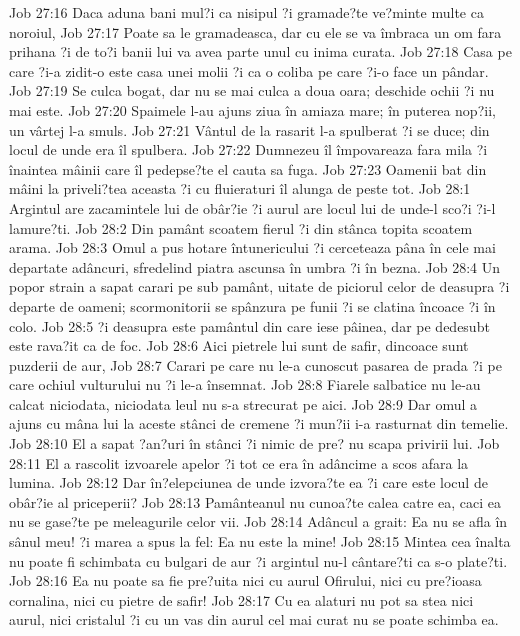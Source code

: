 Job 27:16  Daca aduna bani mul?i ca nisipul ?i gramade?te ve?minte multe ca noroiul,
Job 27:17  Poate sa le gramadeasca, dar cu ele se va îmbraca un om fara prihana ?i de to?i banii lui va avea parte unul cu inima curata.
Job 27:18  Casa pe care ?i-a zidit-o este casa unei molii ?i ca o coliba pe care ?i-o face un pândar.
Job 27:19  Se culca bogat, dar nu se mai culca a doua oara; deschide ochii ?i nu mai este.
Job 27:20  Spaimele l-au ajuns ziua în amiaza mare; în puterea nop?ii, un vârtej l-a smuls.
Job 27:21  Vântul de la rasarit l-a spulberat ?i se duce; din locul de unde era îl spulbera.
Job 27:22  Dumnezeu îl împovareaza fara mila ?i înaintea mâinii care îl pedepse?te el cauta sa fuga.
Job 27:23  Oamenii bat din mâini la priveli?tea aceasta ?i cu fluieraturi îl alunga de peste tot.
Job 28:1  Argintul are zacamintele lui de obâr?ie ?i aurul are locul lui de unde-l sco?i ?i-l lamure?ti.
Job 28:2  Din pamânt scoatem fierul ?i din stânca topita scoatem arama.
Job 28:3  Omul a pus hotare întunericului ?i cerceteaza pâna în cele mai departate adâncuri, sfredelind piatra ascunsa în umbra ?i în bezna.
Job 28:4  Un popor strain a sapat carari pe sub pamânt, uitate de piciorul celor de deasupra ?i departe de oameni; scormonitorii se spânzura pe funii ?i se clatina încoace ?i în colo.
Job 28:5  ?i deasupra este pamântul din care iese pâinea, dar pe dedesubt este rava?it ca de foc.
Job 28:6  Aici pietrele lui sunt de safir, dincoace sunt puzderii de aur,
Job 28:7  Carari pe care nu le-a cunoscut pasarea de prada ?i pe care ochiul vulturului nu ?i le-a însemnat.
Job 28:8  Fiarele salbatice nu le-au calcat niciodata, niciodata leul nu s-a strecurat pe aici.
Job 28:9  Dar omul a ajuns cu mâna lui la aceste stânci de cremene ?i mun?ii i-a rasturnat din temelie.
Job 28:10  El a sapat ?an?uri în stânci ?i nimic de pre? nu scapa privirii lui.
Job 28:11  El a rascolit izvoarele apelor ?i tot ce era în adâncime a scos afara la lumina.
Job 28:12  Dar în?elepciunea de unde izvora?te ea ?i care este locul de obâr?ie al priceperii?
Job 28:13  Pamânteanul nu cunoa?te calea catre ea, caci ea nu se gase?te pe meleagurile celor vii.
Job 28:14  Adâncul a grait: Ea nu se afla în sânul meu! ?i marea a spus la fel: Ea nu este la mine!
Job 28:15  Mintea cea înalta nu poate fi schimbata cu bulgari de aur ?i argintul nu-l cântare?ti ca s-o plate?ti.
Job 28:16  Ea nu poate sa fie pre?uita nici cu aurul Ofirului, nici cu pre?ioasa cornalina, nici cu pietre de safir!
Job 28:17  Cu ea alaturi nu pot sa stea nici aurul, nici cristalul ?i cu un vas din aurul cel mai curat nu se poate schimba ea.
